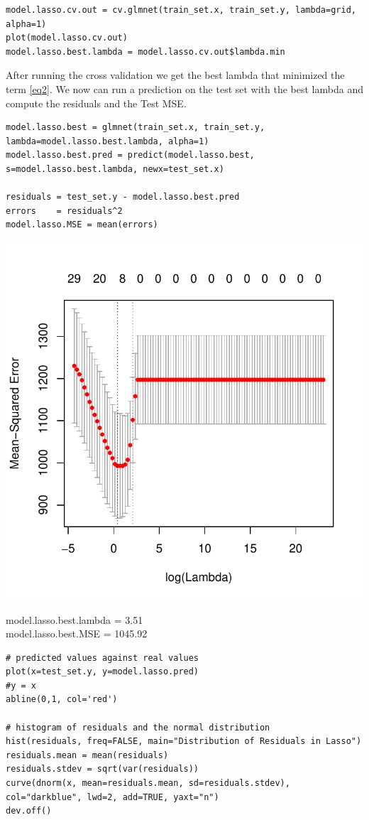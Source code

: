 \documentclass[]{report}
\begin{document}
\begin{lstlisting}
model.lasso.cv.out = cv.glmnet(train_set.x, train_set.y, lambda=grid, alpha=1)
plot(model.lasso.cv.out)
model.lasso.best.lambda = model.lasso.cv.out$lambda.min
\end{lstlisting}

After running the cross validation we get the best lambda that minimized the term \ref{eq2}. We now can run a prediction on the test set with the best lambda and compute the residuals and the Test MSE.

\begin{lstlisting}
model.lasso.best = glmnet(train_set.x, train_set.y, lambda=model.lasso.best.lambda, alpha=1)
model.lasso.best.pred = predict(model.lasso.best, s=model.lasso.best.lambda, newx=test_set.x)

residuals = test_set.y - model.lasso.best.pred
errors    = residuals^2
model.lasso.MSE = mean(errors)

\end{lstlisting}

\begin{center}
	\includegraphics[width=0.8\linewidth]{Figures/lasso_mse.pdf}
\end{center}

\begin{center} 
	model.lasso.best.lambda = 3.51 \\
	model.lasso.best.MSE    = 1045.92
\end{center} 

\begin{lstlisting}
# predicted values against real values
plot(x=test_set.y, y=model.lasso.pred)
#y = x
abline(0,1, col='red')

# histogram of residuals and the normal distribution
hist(residuals, freq=FALSE, main="Distribution of Residuals in Lasso")
residuals.mean = mean(residuals)
residuals.stdev = sqrt(var(residuals))
curve(dnorm(x, mean=residuals.mean, sd=residuals.stdev), col="darkblue", lwd=2, add=TRUE, yaxt="n")
dev.off()
\end{lstlisting}
\end{document}
